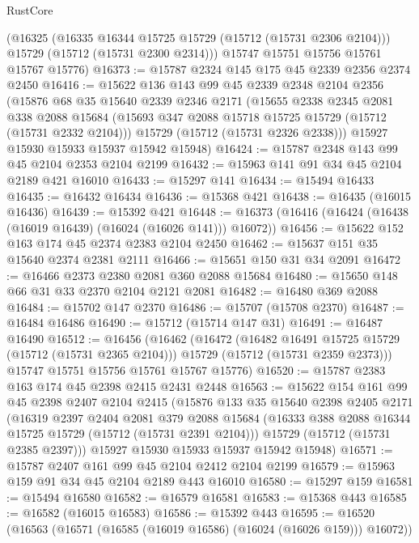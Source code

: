 \begin{lexlean}{RustCore}
\begin{coremodule}
      (@16325
        (@16335 @16344 @15725 @15729 (@15712 (@15731 @2306 @2104)))
        @15729
        (@15712 (@15731 @2300 @2314)))
      @15747
      @15751
      @15756
      @15761
      @15767
      @15776)
@16373 := @15787 @2324 @145 @175 @45 @2339 @2356 @2374 @2450
@16416 := @15622
    @136
    @143
    @99
    @45
    @2339
    @2348
    @2104
    @2356
    (@15876
      @68
      @35
      @15640
      @2339
      @2346
      @2171
      (@15655
        @2338
        @2345
        @2081
        @338
        @2088
        @15684
        (@15693 @347 @2088 @15718 @15725 @15729 (@15712 (@15731 @2332 @2104)))
        @15729
        (@15712 (@15731 @2326 @2338)))
      @15927
      @15930
      @15933
      @15937
      @15942
      @15948)
@16424 := @15787 @2348 @143 @99 @45 @2104 @2353 @2104 @2199
@16432 := @15963 @141 @91 @34 @45 @2104 @2189 @421 @16010
@16433 := @15297 @141
@16434 := @15494 @16433
@16435 := @16432 @16434
@16436 := @15368 @421
@16438 := @16435 (@16015 @16436)
@16439 := @15392 @421
@16448 := @16373 (@16416 (@16424 (@16438 (@16019 @16439) (@16024 (@16026 @141))) @16072))
@16456 := @15622 @152 @163 @174 @45 @2374 @2383 @2104 @2450
@16462 := @15637 @151 @35 @15640 @2374 @2381 @2111
@16466 := @15651 @150 @31 @34 @2091
@16472 := @16466 @2373 @2380 @2081 @360 @2088 @15684
@16480 := @15650 @148 @66 @31 @33 @2370 @2104 @2121 @2081
@16482 := @16480 @369 @2088
@16484 := @15702 @147 @2370
@16486 := @15707 (@15708 @2370)
@16487 := @16484 @16486
@16490 := @15712 (@15714 @147 @31)
@16491 := @16487 @16490
@16512 := @16456
    (@16462
      (@16472
        (@16482 @16491 @15725 @15729 (@15712 (@15731 @2365 @2104)))
        @15729
        (@15712 (@15731 @2359 @2373)))
      @15747
      @15751
      @15756
      @15761
      @15767
      @15776)
@16520 := @15787 @2383 @163 @174 @45 @2398 @2415 @2431 @2448
@16563 := @15622
    @154
    @161
    @99
    @45
    @2398
    @2407
    @2104
    @2415
    (@15876
      @133
      @35
      @15640
      @2398
      @2405
      @2171
      (@16319
        @2397
        @2404
        @2081
        @379
        @2088
        @15684
        (@16333 @388 @2088 @16344 @15725 @15729 (@15712 (@15731 @2391 @2104)))
        @15729
        (@15712 (@15731 @2385 @2397)))
      @15927
      @15930
      @15933
      @15937
      @15942
      @15948)
@16571 := @15787 @2407 @161 @99 @45 @2104 @2412 @2104 @2199
@16579 := @15963 @159 @91 @34 @45 @2104 @2189 @443 @16010
@16580 := @15297 @159
@16581 := @15494 @16580
@16582 := @16579 @16581
@16583 := @15368 @443
@16585 := @16582 (@16015 @16583)
@16586 := @15392 @443
@16595 := @16520 (@16563 (@16571 (@16585 (@16019 @16586) (@16024 (@16026 @159))) @16072))

\end{coremodule}
\end{lexlean}
